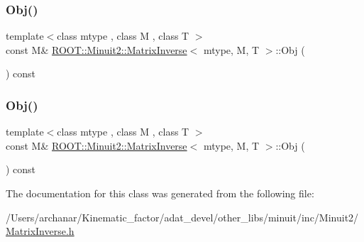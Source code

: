 \subsubsection{\texorpdfstring{Obj()}{Obj()}\hspace{0.1cm}{\footnotesize\ttfamily [1/2]}}
{\footnotesize\ttfamily template$<$class mtype , class M , class T $>$ \\
const M\& \mbox{\hyperlink{classROOT_1_1Minuit2_1_1MatrixInverse}{R\+O\+O\+T\+::\+Minuit2\+::\+Matrix\+Inverse}}$<$ mtype, M, T $>$\+::Obj (\begin{DoxyParamCaption}{ }\end{DoxyParamCaption}) const\hspace{0.3cm}{\ttfamily [inline]}}

\mbox{\label{classROOT_1_1Minuit2_1_1MatrixInverse_a189a8ae3c36a989a47758de7aee4e181}} 
\subsubsection{\texorpdfstring{Obj()}{Obj()}\hspace{0.1cm}{\footnotesize\ttfamily [2/2]}}
{\footnotesize\ttfamily template$<$class mtype , class M , class T $>$ \\
const M\& \mbox{\hyperlink{classROOT_1_1Minuit2_1_1MatrixInverse}{R\+O\+O\+T\+::\+Minuit2\+::\+Matrix\+Inverse}}$<$ mtype, M, T $>$\+::Obj (\begin{DoxyParamCaption}{ }\end{DoxyParamCaption}) const\hspace{0.3cm}{\ttfamily [inline]}}



The documentation for this class was generated from the following file\+:\begin{DoxyCompactItemize}
\item 
/\+Users/archanar/\+Kinematic\+\_\+factor/adat\+\_\+devel/other\+\_\+libs/minuit/inc/\+Minuit2/\mbox{\hyperlink{other__libs_2minuit_2inc_2Minuit2_2MatrixInverse_8h}{Matrix\+Inverse.\+h}}\end{DoxyCompactItemize}
